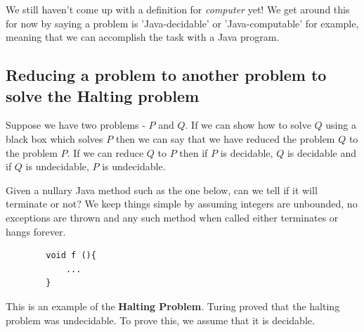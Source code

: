 \documentclass[11pt]{article}
\begin{document}
	We still haven't come up with a definition for \textit{computer} yet! We get around this for now by saying a problem is 'Java-decidable' or 'Java-computable' for example, meaning that we can accomplish the task with a Java program.

	\subsection{Reducing a problem to another problem to solve the Halting problem}
	Suppose we have two problems - $P$ and $Q$. If we can show how to solve $Q$ using a black box which solves $P$ then we can say that we have reduced the problem $Q$ to the problem $P$. If we can reduce $Q$ to $P$ then if $P$ is decidable, $Q$ is decidable and if $Q$ is undecidable, $P$ is undecidable.
	
	\par
	Given a nullary Java method such as the one below, can we tell if it will terminate or not? We keep things simple by assuming integers are unbounded, no exceptions are thrown and any such method when called either terminates or hangs forever.
	\begin{verbatim}
		void f (){
		    ...
		}
	\end{verbatim}
	
	This is an example of the \textbf{Halting Problem}. Turing proved that the halting problem was undecidable. To prove this, we assume that it is decidable.
	
\end{document}
